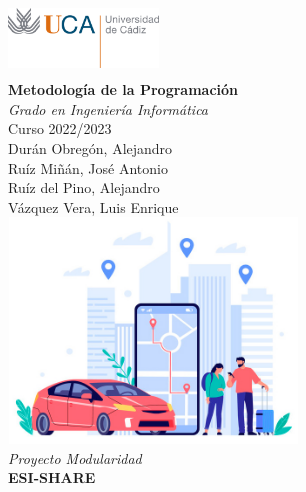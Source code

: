 
\begin{titlepage}
  
  \begin{minipage}{14cm}
    \center

    \includegraphics[width=4cm,height=2cm]{FOTOS/uca}\\[1cm]
  
    {\Huge\bfseries Metodología de la Programación}\\[1\baselineskip]
    {\huge\textit{Grado en Ingeniería Informática}}\\[1\baselineskip]
    {\large Curso 2022/2023}\\[2\baselineskip]
    
    {\large {Durán Obregón, Alejandro}}\\[0.3cm]
    {\large {Ruíz Miñán, José Antonio}}\\[0.3cm]
    {\large {Ruíz del Pino, Alejandro}}\\[0.3cm]
    {\large {Vázquez Vera, Luis Enrique}}\\[0.3cm]

    \includegraphics[width=7.7cm,height=6cm]{FOTOS/logo}\\[1cm]
    
    {\Large\textit{Proyecto Modularidad}}\\[1\baselineskip]
    {\Large\textbf{ESI-SHARE}}\\
    
  \end{minipage}
 
\end{titlepage}